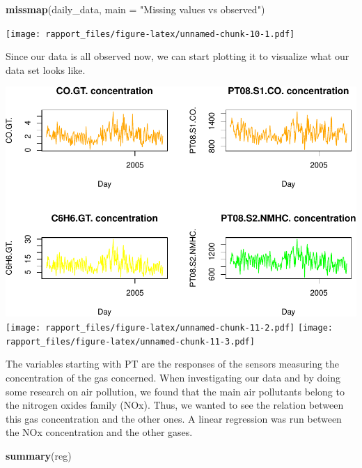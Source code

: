 \documentclass[]{article}
\newenvironment{Shaded}{\begin{snugshade}}{\end{snugshade}}
\newcommand{\KeywordTok}[1]{\textcolor[rgb]{0.13,0.29,0.53}{\textbf{#1}}}
\newcommand{\DataTypeTok}[1]{\textcolor[rgb]{0.13,0.29,0.53}{#1}}
\newcommand{\StringTok}[1]{\textcolor[rgb]{0.31,0.60,0.02}{#1}}
\newcommand{\NormalTok}[1]{#1}
\begin{document}
\begin{Shaded}
\begin{Highlighting}[]
\KeywordTok{missmap}\NormalTok{(daily_data, }\DataTypeTok{main =} \StringTok{"Missing values vs observed"}\NormalTok{)}
\end{Highlighting}
\end{Shaded}

\texttt{[image: rapport\_files/figure-latex/unnamed-chunk-10-1.pdf]}

Since our data is all observed now, we can start plotting it to
visualize what our data set looks like.

\includegraphics{rapport_files/figure-latex/unnamed-chunk-11-1.pdf}
\texttt{[image: rapport\_files/figure-latex/unnamed-chunk-11-2.pdf]}
\texttt{[image: rapport\_files/figure-latex/unnamed-chunk-11-3.pdf]}

The variables starting with PT are the responses of the sensors
measuring the concentration of the gas concerned. When investigating our
data and by doing some research on air pollution, we found that the main
air pollutants belong to the nitrogen oxides family (NOx). Thus, we
wanted to see the relation between this gas concentration and the other
ones. A linear regression was run between the NOx concentration and the
other gases.

\begin{Shaded}
\begin{Highlighting}[]
\KeywordTok{summary}\NormalTok{(reg)}
\end{Highlighting}
\end{Shaded}
\end{document}
